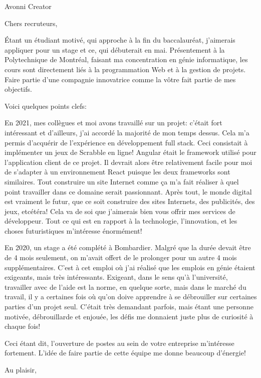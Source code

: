 \documentclass[12pt,french]{letter}
\begin{document}
\pagestyle{headings}

\begin{letter}{Avonni Creator}
\address{Montréal, Canada}

\opening{Chers recruteurs,}


Étant un étudiant motivé, qui approche à la fin du baccalauréat, j’aimerais appliquer pour un stage et ce, qui débuterait en mai.  Présentement à la Polytechnique de Montréal, faisant ma concentration en génie informatique, les cours sont directement liés à la programmation Web et à la gestion de projets.  Faire partie d’une compagnie innovatrice comme la vôtre fait partie de mes objectifs.

Voici quelques points clefs:

En 2021, mes collègues et moi avons travaillé sur un projet: c’était fort intéressant et d’ailleurs, j’ai accordé la majorité de mon temps dessus.  Cela m'a permis d’acquérir de l’expérience en développement full stack.  Ceci consistait à implémenter un jeux de Scrabble en ligne! Angular était le framework utilisé pour l'application client de ce projet. Il devrait alors être relativement facile pour moi de s'adapter à un environnement React puisque les deux frameworks sont similaires.  Tout construire un site Internet comme ça m’a fait réaliser à quel point travailler dans ce domaine serait passionnant.  Après tout, le monde digital est vraiment le futur, que ce soit construire des sites Internets, des publicités, des jeux, etcétéra!  Cela va de soi que j’aimerais bien vous offrir mes services de développeur.  Tout ce qui est en rapport à la technologie, l’innovation, et les choses futuristiques m’intéresse énormément! 

En 2020, un stage a été complété à Bombardier.  Malgré que la durée devait être de 4 mois seulement, on m’avait offert de le prolonger pour un autre 4 mois supplémentaires.  C’est à cet emploi où j’ai réalisé que les emplois en génie étaient exigeants, mais très intéressants. Exigeant, dans le sens qu’à l’université, travailler avec de l'aide est la norme, en quelque sorte, mais dans le marché du travail, il y a certaines fois où qu’on doive apprendre à se débrouiller sur certaines parties d’un projet seul.  C’était très demandant parfois, mais étant une personne motivée, débrouillarde et enjouée, les défis me donnaient juste plus de curiosité à chaque fois!

Ceci étant dit, l'ouverture de postes au sein de votre entreprise m’intéresse fortement.
L’idée de faire partie de cette équipe me donne beaucoup d’énergie!


\signature{Maxime Laroche}

\closing{Au plaisir,}


\end{letter}
\end{document}
